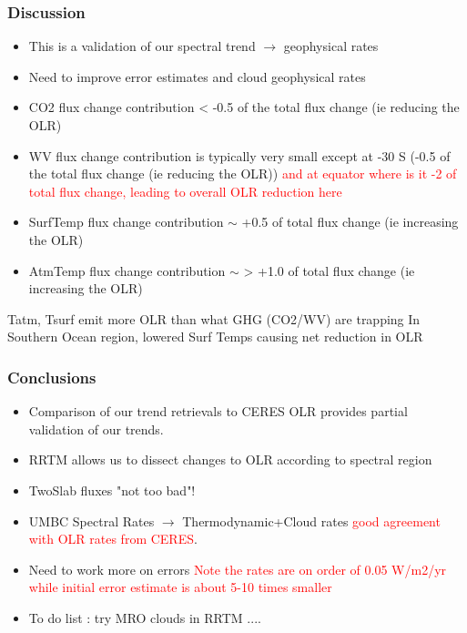 \documentclass[10pt,t]{beamer}
\begin{document}
\begin{frame}
  \frametitle{Discussion}
  \begin{itemize}
    \item This is a validation of our spectral trend $\rightarrow$ geophysical rates
    \item Need to improve error estimates and cloud geophysical rates
    \item CO2 flux change contribution < -0.5 of the total flux change (ie reducing the OLR)
    \item WV  flux change contribution is typically very small except at -30 S (-0.5 of the total flux change (ie reducing the OLR))
          \textcolor{red}{and at equator where is it -2 of total flux change, leading to overall OLR reduction here}
    \item SurfTemp flux change contribution $\sim$ +0.5 of total flux change (ie increasing the OLR)
    \item AtmTemp  flux change contribution $\sim$ > +1.0 of total flux change (ie increasing the OLR)            
  \end{itemize}
  Tatm, Tsurf emit more OLR than what GHG (CO2/WV) are trapping \newline
  In Southern Ocean region, lowered Surf Temps causing net reduction in OLR
  \end{frame}

\begin{frame}
  \frametitle{Conclusions}
  \begin{itemize}
  \item Comparison of our trend retrievals to CERES OLR provides partial validation of our trends.
  \item RRTM allows us to dissect changes to OLR according to spectral region
  \item TwoSlab fluxes "not too bad"!
  \item UMBC Spectral Rates $\rightarrow$ Thermodynamic+Cloud rates \textcolor{red}{good agreement
        with OLR rates from CERES}. 
  \item Need to work more on errors \textcolor{red}{Note the rates are on order of 0.05 W/m2/yr while initial error estimate is about 5-10 times smaller}  
  \item To do list : try MRO clouds in RRTM ....
  \end{itemize}
\end{frame}
\end{document}
